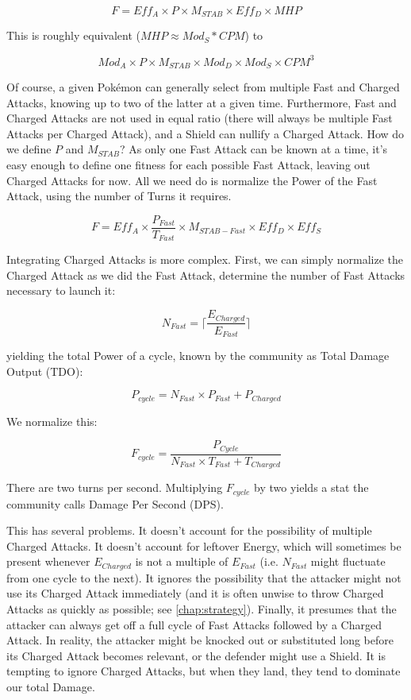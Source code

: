\[ F = Eff_A \times P \times M_{STAB} \times Eff_D \times MHP \]

This is roughly equivalent ($MHP \approx Mod_S * CPM$) to

\[ Mod_A \times P \times M_{STAB} \times Mod_D \times Mod_S \times CPM^3 \]

Of course, a given Pokémon can generally select from multiple Fast and Charged Attacks,
  knowing up to two of the latter at a given time.
Furthermore, Fast and Charged Attacks are not used in equal ratio (there will
  always be multiple Fast Attacks per Charged Attack), and a Shield can
  nullify a Charged Attack.
How do we define $P$ and $M_{STAB}$?
As only one Fast Attack can be known at a time, it's easy enough to define one
  fitness for each possible Fast Attack, leaving out Charged Attacks for now.
All we need do is normalize the Power of the Fast Attack, using the number of
  Turns it requires.

\[ F = Eff_A \times \frac{P_{Fast}}{T_{Fast}} \times M_{STAB-Fast} \times Eff_D \times Eff_S \]

Integrating Charged Attacks is more complex.
First, we can simply normalize the Charged Attack as we did the Fast Attack,
 determine the number of Fast Attacks necessary to launch it:

\[ N_{Fast} = \lceil\frac{E_{Charged}}{E_{Fast}}\rceil \]

yielding the total Power of a cycle, known by the community as Total Damage Output (TDO):

\[ P_{cycle} = N_{Fast} \times P_{Fast} + P_{Charged} \]

We normalize this:

\[ F_{cycle} = \frac{P_{Cycle}}{N_{Fast} \times T_{Fast} + T_{Charged}} \]

There are two turns per second. Multiplying $F_{cycle}$ by two yields a
  stat the community calls Damage Per Second (DPS).

This has several problems. It doesn't account for the possibility of multiple
Charged Attacks. It doesn't account for leftover Energy, which will sometimes
be present whenever $E_{Charged}$ is not a multiple of $E_{Fast}$ (i.e. $N_{Fast}$
might fluctuate from one cycle to the next). It ignores the possibility that
the attacker might not use its Charged Attack immediately (and it is often
unwise to throw Charged Attacks as quickly as possible; see
\autoref{chap:strategy}). Finally, it presumes that the attacker can always get
off a full cycle of Fast Attacks followed by a Charged Attack. In reality, the
attacker might be knocked out or substituted long before its Charged Attack
becomes relevant, or the defender might use a Shield. It is tempting to ignore
Charged Attacks, but when they land, they tend to dominate our total Damage.


